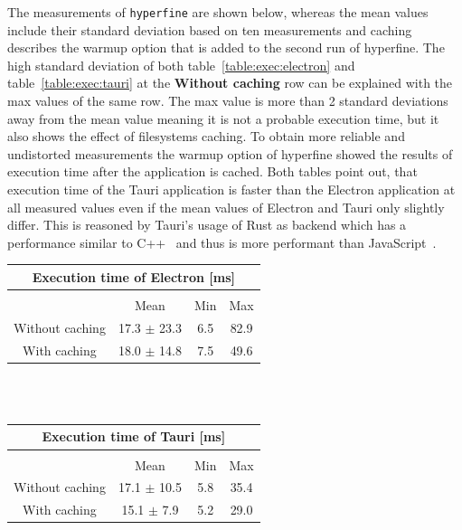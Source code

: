 The measurements of \texttt{hyperfine} are shown below, whereas the mean values include their standard deviation based on ten measurements and caching describes the warmup option that is added to the second run of hyperfine.
The high standard deviation of both table~\ref{table:exec:electron} and table~\ref{table:exec:tauri} at the \textbf{Without caching} row can be explained with the max values of the same row.
The max value is more than 2 standard deviations away from the mean value meaning it is not a probable execution time, but it also shows the effect of filesystems caching.
To obtain more reliable and undistorted measurements the warmup option of hyperfine showed the results of execution time after the application is cached.
Both tables point out, that execution time of the Tauri application is faster than the Electron application at all measured values even if the mean values of Electron and Tauri only slightly differ.
This is reasoned by Tauri's usage of Rust as backend which has a performance similar to C++~\cite{rustPerformance} and thus is more performant than JavaScript~\cite{C++Javascript}.

\begin{tabular} {| c | c | c | c |}
    \hline
    \multicolumn{4}{|c|}{Execution time of Electron [ms]} \\ \hline
     \multicolumn{4}{|c|}{}\\ \hline
     & Mean   & Min & Max     \\ \hline
    Without caching & 17.3 $\pm$ 23.3 & 6.5 & 82.9  \\ \hline
    With caching & 18.0 $\pm$ 14.8 & 7.5 & 49.6 \\ \hline
\end{tabular}
\label{table:exec:electron}
\\ \\

\begin{tabular} {| c | c | c | c |}
    \hline
    \multicolumn{4}{|c|}{Execution time of Tauri [ms]} \\ \hline
    \multicolumn{4}{|c|}{}\\ \hline
    & Mean & Min & Max     \\ \hline
    Without caching & 17.1 $\pm$ 10.5 & 5.8 & 35.4  \\ \hline
    With caching & 15.1 $\pm$ 7.9 & 5.2 & 29.0 \\ \hline
\end{tabular}
\label{table:exec:tauri}
\\ \\
